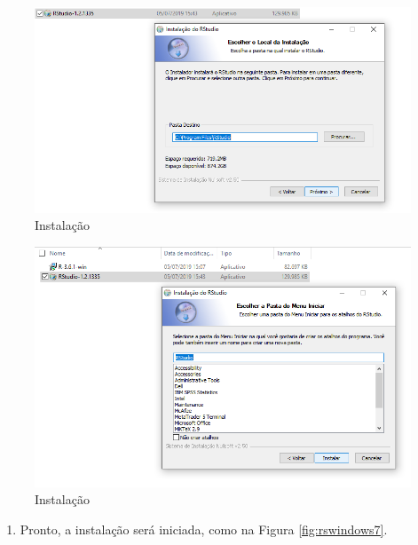 \documentclass[
]{book}
\providecommand{\tightlist}{%
  \setlength{\itemsep}{0pt}\setlength{\parskip}{0pt}}
\begin{document}
\begin{figure}
\includegraphics[width=1\linewidth]{figures/install_Rstudio5} \caption{\label{fig:rswindows5} Instalação}\label{fig:rswindows5}
\end{figure}

\begin{figure}
\includegraphics[width=1\linewidth]{figures/install_Rstudio6} \caption{\label{fig:rswindows6} Instalação}\label{fig:rswindows6}
\end{figure}

\begin{enumerate}
\def\labelenumi{\arabic{enumi})}
\setcounter{enumi}{4}
\tightlist
\item
  Pronto, a instalação será iniciada, como na Figura \ref{fig:rswindows7}.
\end{enumerate}
\end{document}
